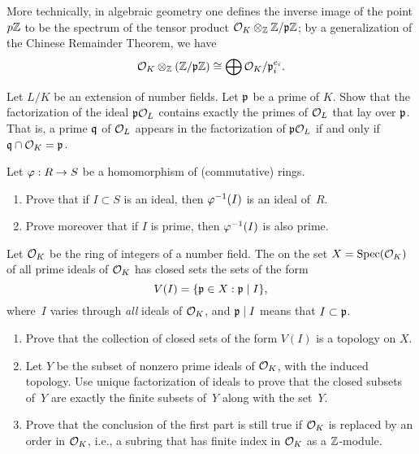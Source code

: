 \begin{remark}
	More technically, in algebraic geometry one defines the inverse
	image of the point $p\mathbb{Z}$ to be the spectrum of the tensor product
	$\mathcal{O}_K \otimes_{\mathbb{Z}} \mathbb{Z}/\mathfrak{p}\mathbb{Z}$; by a generalization of the Chinese
	Remainder Theorem, we have
	$$
		\mathcal{O}_K \otimes_{\mathbb{Z}} \left(\mathbb{Z}/\mathfrak{p}\mathbb{Z}\right) \cong \bigoplus \mathcal{O}_K/\mathfrak{p}_i^{e_i}.
	$$
\end{remark}

\begin{exercise}
	Let $L/K$ be an extension of number fields. Let $\mathfrak{p}$ be a prime of $K$.
	Show that the factorization of the ideal $\mathfrak{p}\mathcal{O}_L$ contains exactly the primes
	of $\mathcal{O}_L$ that lay over $\mathfrak{p}$. That is, a prime $\mathfrak{q}$ of $\mathcal{O}_L$ appears in
	the factorization of $\mathfrak{p}\mathcal{O}_L$ if and only if $\mathfrak{q} \cap \mathcal{O}_K = \mathfrak{p}$.
\end{exercise}

\begin{exercise}
	Let $\varphi:R\to S$ be a homomorphism of (commutative) rings.
	\begin{enumerate}
		\item Prove that if $I\subset S$ is an ideal, then $\varphi^{-1}(I)$
		is an ideal of~$R$.
		\item Prove moreover that if $I$ is prime, then $\varphi^{-1}(I)$ is
		also prime.
	\end{enumerate}
\end{exercise}

\begin{exercise}
	Let $\mathcal{O}_K$ be the ring of integers of a number field.
	The  on the set $X=\operatorname{Spec}(\mathcal{O}_K)$ of all prime ideals
	of $\mathcal{O}_K$ has closed sets the sets of the form
	$$
		V(I) = \{ \mathfrak{p}\in X : \mathfrak{p} \mid I\},
	$$
	where~$I$ varies through {\em all} ideals of $\mathcal{O}_K$, and $\mathfrak{p}\mid I$ means
	that $I \subset \mathfrak{p}$.
	\begin{enumerate}
		\item\label{exercise:zariski-part-1} Prove that the collection of closed
		sets of the form $V(I)$ is a topology on $X$.
		\item Let $Y$ be the subset of nonzero prime ideals of $\mathcal{O}_K$, with the
		induced topology. Use unique factorization of ideals to prove that the
		closed subsets of~$Y$ are exactly the finite subsets of~$Y$ along with
		the set~$Y$.
		\item Prove that the conclusion of the first part is still true
		if $\mathcal{O}_K$ is replaced by an order in $\mathcal{O}_K$, i.e., a subring that
		has finite index in $\mathcal{O}_K$ as a $\mathbb{Z}$-module.
	\end{enumerate}
\end{exercise}

